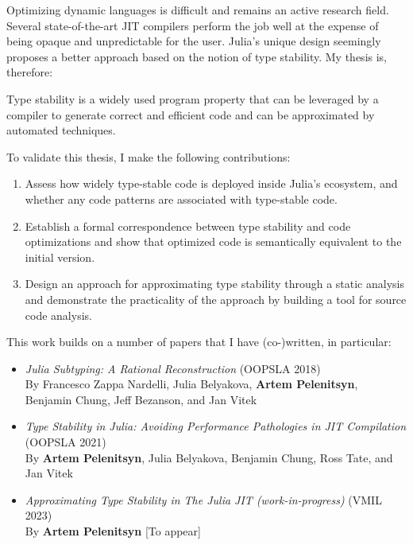 Optimizing dynamic languages is difficult and remains an active research field.
Several state-of-the-art JIT compilers perform the job well at the expense of being
opaque and unpredictable for the user.
Julia's unique design seemingly proposes a better approach based on the notion
of type stability. My thesis is, therefore:

\begin{itquote}
Type stability
is a widely used program property that can be leveraged by a compiler to generate
correct and efficient code
and can be approximated by automated techniques.
\end{itquote}

To validate this thesis, I make the following contributions:
\begin{enumerate}

  \item
  Assess how widely type-stable code is deployed inside Julia's ecosystem, and
  whether any code patterns are associated with type-stable code.

  \item
  Establish a formal correspondence between type stability and code optimizations and
  show that optimized code is semantically equivalent to the initial version.

  \item
  Design an approach for approximating type stability through a static analysis and
  demonstrate the practicality of the approach by building a tool for source code analysis.
\end{enumerate}


This work builds on a number of papers that I have (co-)written, in particular:
\begin{itemize}
  \item \emph{Julia Subtyping: A Rational Reconstruction} (OOPSLA 2018)\\
  By Francesco Zappa Nardelli, Julia Belyakova, \textbf{Artem Pelenitsyn},
  Benjamin Chung, Jeff Bezanson, and Jan Vitek~\cite{oopsla18b}

  \item \emph{Type Stability in Julia: Avoiding Performance Pathologies in JIT
  Compilation} (OOPSLA 2021)\\
  By \textbf{Artem Pelenitsyn}, Julia Belyakova, Benjamin Chung, Ross Tate, and Jan
  Vitek~\cite{Pelenitsyn21}

  \item \emph{Approximating Type Stability in The Julia JIT (work-in-progress)} (VMIL 2023)\\
  By \textbf{Artem Pelenitsyn} [To appear]
\end{itemize}
